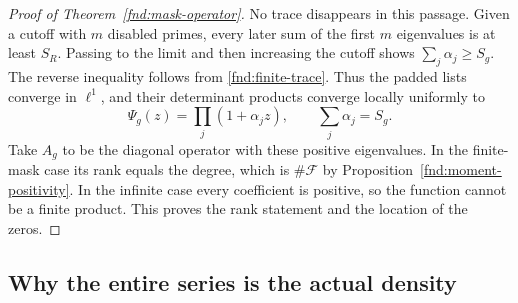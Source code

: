 \begin{proof}[Proof of Theorem~\ref{fnd:mask-operator}]
No trace disappears in this passage.  Given a cutoff with $m$
disabled primes, every later sum of the first $m$ eigenvalues is
at least $S_R$.  Passing to the limit and then increasing the
cutoff shows $\sum_j\alpha_j\ge S_g$.  The reverse inequality
follows from \eqref{fnd:finite-trace}.  Thus the padded lists
converge in $\ell^1$, and their determinant products converge
locally uniformly to
\[
 \Psi_g(z)=\prod_j(1+\alpha_jz),\qquad \sum_j\alpha_j=S_g.
\]
Take $A_g$ to be the diagonal operator with these positive
eigenvalues.  In the finite-mask case its rank equals the degree,
which is $\#\mathcal F$ by Proposition~\ref{fnd:moment-positivity}.
In the infinite case every coefficient is positive, so the function
cannot be a finite product.  This proves the rank statement and
the location of the zeros.
\end{proof}

\subsection{Why the entire series is the actual density}\label{app:fnd:entire-density}

